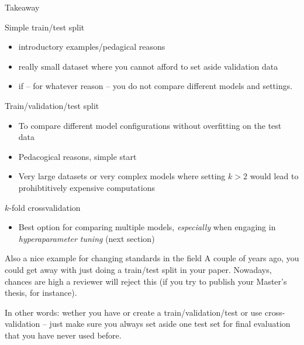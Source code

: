 \begin{frame}[allowframebreaks]{Takeaway}

\begin{block}{Simple train/test split}
\begin{itemize}
\item introductory examples/pedagical reasons
\item really small dataset where you cannot afford to set aside validation data
\item if -- for whatever reason -- you do not compare different models and settings.
\end{itemize}
\end{block}

\framebreak

\begin{block}{Train/validation/test split}
  \begin{itemize}
  \item To compare different model configurations without overfitting on the test data
  \item Pedacogical reasons, simple start
  \item Very large datasets or very complex models where setting $k>2$ would lead to prohibtitively expensive computations
  \end{itemize}
\end{block}

\framebreak

\begin{block}{$k$-fold crossvalidation}
  \begin{itemize}
  \item Best option for comparing multiple models, \emph{especially} when engaging in \emph{hyperaparameter tuning} (next section)
	\end{itemize}
\end{block}

\pause
\begin{alertblock}{Also a nice example for changing standards in the field}
A couple of years ago, you could get away with just doing a train/test split in your paper. Nowadays, chances are high a reviewer will reject this (if you try to publish your Master's thesis, for instance).
\end{alertblock}


\end{frame}



\begin{frame}[standout]
In other words: wether you have or create a train/validation/test or use cross-validation -- just make sure you always set aside one test set for final evaluation that you have never used before.
\end{frame}





